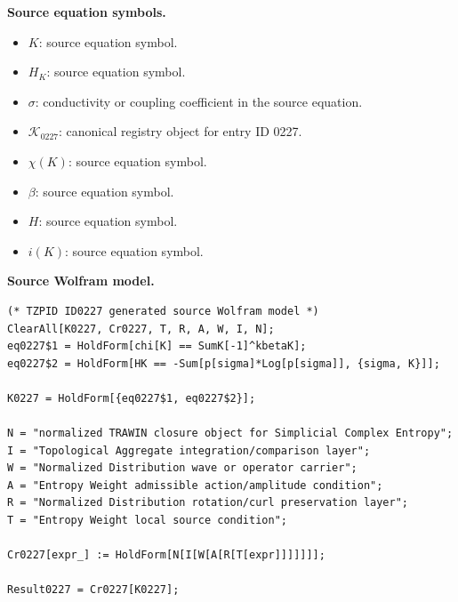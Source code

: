 \begin{minipage}[t]{0.49\linewidth}
\begingroup
\small
\raggedright
\textbf{Source equation symbols.}\par
\begin{itemize}[leftmargin=1.35em,itemsep=1pt,topsep=1pt,parsep=0pt]
    \item $K$: source equation symbol.
    \item $H_K$: source equation symbol.
    \item $\sigma$: conductivity or coupling coefficient in the source equation.
    \item $\mathcal{K}_{0227}$: canonical registry object for entry ID 0227.
    \item $\chi(K)$: source equation symbol.
    \item $\beta$: source equation symbol.
    \item $H$: source equation symbol.
    \item $i(K)$: source equation symbol.
\end{itemize}
\endgroup
\end{minipage}\hfill
\begin{minipage}[t]{0.47\linewidth}
\begingroup
\scriptsize
\raggedright
\textbf{Source Wolfram model.}\par
\begin{Verbatim}[fontsize=\tiny,breaklines=true,breakanywhere=true]
(* TZPID ID0227 generated source Wolfram model *)
ClearAll[K0227, Cr0227, T, R, A, W, I, N];
eq0227$1 = HoldForm[chi[K] == SumK[-1]^kbetaK];
eq0227$2 = HoldForm[HK == -Sum[p[sigma]*Log[p[sigma]], {sigma, K}]];

K0227 = HoldForm[{eq0227$1, eq0227$2}];

N = "normalized TRAWIN closure object for Simplicial Complex Entropy";
I = "Topological Aggregate integration/comparison layer";
W = "Normalized Distribution wave or operator carrier";
A = "Entropy Weight admissible action/amplitude condition";
R = "Normalized Distribution rotation/curl preservation layer";
T = "Entropy Weight local source condition";

Cr0227[expr_] := HoldForm[N[I[W[A[R[T[expr]]]]]]];

Result0227 = Cr0227[K0227];
\end{Verbatim}
\endgroup
\end{minipage}

